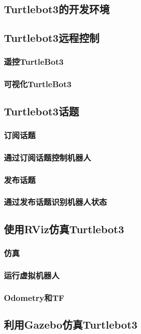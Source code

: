 \documentclass[geye,green,kindle,cn]{elegantnote}
\begin{document}
\subsection{Turtlebot3的开发环境}
\subsection{Turtlebot3远程控制}
\subsubsection{遥控TurtleBot3}
\subsubsection{可视化TurtleBot3}
\subsection{Turtlebot3话题}
\subsubsection{订阅话题}
\subsubsection{通过订阅话题控制机器人}
\subsubsection{发布话题}
\subsubsection{通过发布话题识别机器人状态}
\subsection{使用RViz仿真Turtlebot3}
\subsubsection{仿真}
\subsubsection{运行虚拟机器人}
\subsubsection{Odometry和TF}
\subsection{利用Gazebo仿真Turtlebot3}
\end{document}
